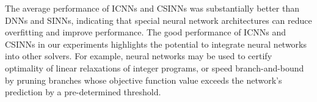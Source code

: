 \documentclass[10pt]{article} %
\theoremstyle{plain}
\theoremstyle{definition}
\theoremstyle{remark}
\begin{document}
The average performance of ICNNs and CSINNs was substantially better than DNNs and SINNs, indicating that special neural network architectures can reduce overfitting and improve performance.
The good performance of ICNNs and CSINNs in our experiments highlights the potential to integrate neural networks into other solvers. For example, neural networks may be used to certify optimality of linear relaxations of integer programs, or speed branch-and-bound by pruning branches whose objective function value exceeds the network's prediction by a pre-determined threshold.

\end{document}
